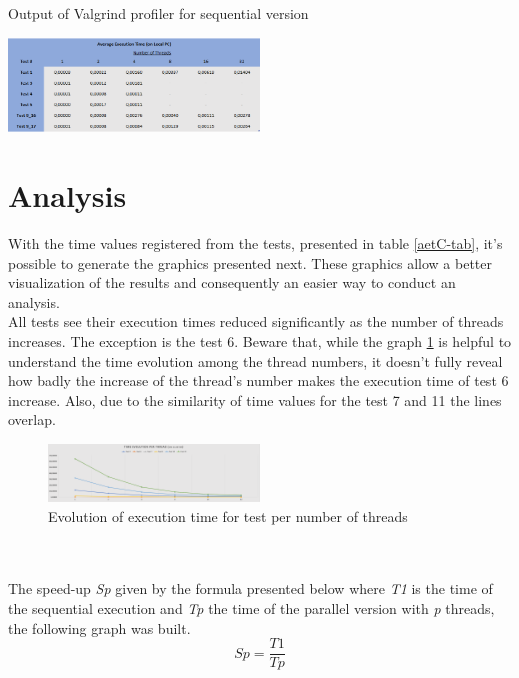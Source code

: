 \documentclass[10pt,journal,compsoc]{IEEEtran}
\begin{document}
\begin{table}[h]
\centering
\caption{Output of Valgrind profiler for sequential version}
\includegraphics[width=0.5\textwidth]{../DRAFT/PerformanceAnalysis - Prints/Average Execution Time (local) - Table.PNG}
\label{aetL-tab}
\end{table}

\section{Analysis}
With the time values registered from the tests, presented in table \ref{aetC-tab}, it's possible to generate the graphics presented next. These graphics allow a better visualization of the results and consequently an easier way to conduct an analysis.
\\
All tests see their execution times reduced significantly as the number of threads increases. The exception is the test 6. Beware that, while the graph \ref{timeEv-pic} is helpful to understand the time evolution among the thread numbers, it doesn't fully reveal how badly the increase of the thread's number makes the execution time of test 6 increase. Also, due to the similarity of time values for the test 7 and 11 the lines overlap.  
\begin{figure}[h]
\centering
\includegraphics[width=0.5\textwidth]{../DRAFT/PerformanceAnalysis - Prints/Time Evolution per thread (cluster) - Chart.PNG}
\caption{Evolution of execution time for test per number of threads}
\label{timeEv-pic}
\end{figure}
\\
\\
The speed-up \textit{Sp} given by the formula presented below where \textit{T1} is the time of the sequential execution and \textit{Tp} the time of the parallel version with \textit{p} threads, the following graph was built.
\[ Sp = \frac{T1}{Tp} \]
\end{document}
